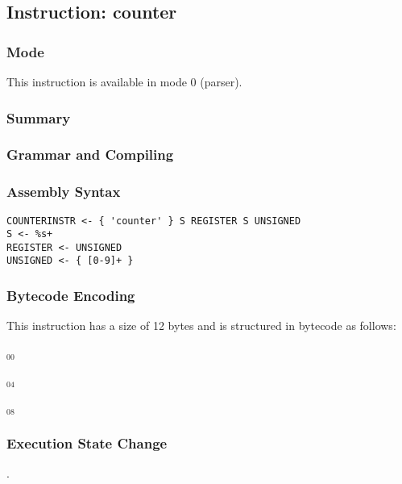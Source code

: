\subsection{Instruction: counter}

\subsubsection{Mode}
This instruction is available in mode 0 (parser).
\subsubsection{Summary}


\subsubsection{Grammar and Compiling}


\subsubsection{Assembly Syntax}

\begin{myquote}
\begin{verbatim}
COUNTERINSTR <- { 'counter' } S REGISTER S UNSIGNED
S <- %s+
REGISTER <- UNSIGNED
UNSIGNED <- { [0-9]+ }
\end{verbatim}
\end{myquote}

\subsubsection{Bytecode Encoding}

This instruction has a size of 12 bytes and is structured in bytecode as follows:

$_{00}$\ 



$_{04}$\ 



$_{08}$\ 
\fbox{%
  \parbox{20pt}{%
00
  }%
}


\subsubsection{Execution State Change}

.


